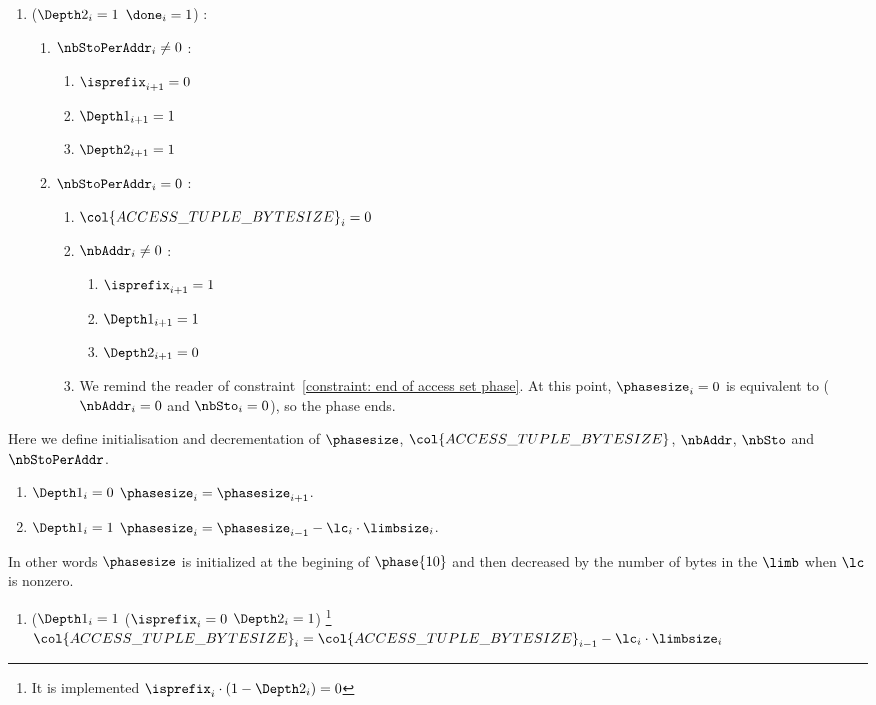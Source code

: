 \begin{enumerate}[resume]
	\item \If ($\Depth2_{i}=1$ \et $\done_{i}=1$) \Then:
	\begin{enumerate}
		\item \If $\nbStoPerAddr_{i} \ne 0$ \Then:
		\begin{enumerate}
		 	\item $\isprefix_{i+1}=0$  
		 	\item $\Depth1_{i+1}=1$ 
		 	\item $\Depth2_{i+1}=1$
		\end{enumerate}
		\item \If $\nbStoPerAddr_{i}=0$ \Then:
		\begin{enumerate}
			\item $\col{ACCESS\_TUPLE\_BYTESIZE}_{i}=0$
		 	\item \If $\nbAddr_{i} \ne 0$ \Then:
		 		\begin{enumerate}
			 		\item $\isprefix_{i+1}=1$
			 		\item $\Depth1_{i+1}=1$
			 		\item $\Depth2_{i+1}=0$
		 		\end{enumerate}
			\item \trash We remind the reader of constraint~\ref{constraint: end of access set phase}. At this point, $\phasesize_{i}=0$ is equivalent to ($\nbAddr_{i} = 0$ and $\nbSto_{i}=0$), so the phase ends.
		\end{enumerate} 
	\end{enumerate}
\end{enumerate}
Here we define initialisation and decrementation of $\phasesize$, $\col{ACCESS\_TUPLE\_BYTESIZE}$, $\nbAddr$, $\nbSto$ and $\nbStoPerAddr$.
\begin{enumerate}[resume]
    \item \If $\Depth1_{i}=0$ \Then $\phasesize_{i} = \phasesize_{i+1}$.
    \item \If $\Depth1_{i}=1$ \Then $\phasesize_{i} = \phasesize_{i-1} - \lc_{i} \cdot \limbsize_{i}$. 
\end{enumerate}
In other words $\phasesize$ is initialized at the begining of $\phase{10}$ and then decreased by the number of bytes in the $\limb$ when $\lc$ is nonzero.
\begin{enumerate}[resume]

    \item \If ($\Depth1_{i}=1$ \et ($\isprefix_{i}=0$ \Or $\Depth2_{i}=1$) \footnote{It is implemented \If $\isprefix_{i} \cdot (1 - \Depth2_{i})=0$ \Then} \Then $\col{ACCESS\_TUPLE\_BYTESIZE}_{i}=\col{ACCESS\_TUPLE\_BYTESIZE}_{i-1} - \lc_{i} \cdot \limbsize_{i}$

\end{enumerate}
